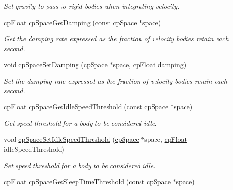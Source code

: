 \begin{DoxyCompactItemize}
\begin{DoxyCompactList}\small\item\em Set gravity to pass to rigid bodies when integrating velocity. \end{DoxyCompactList}\item 
\hyperlink{group__basic_types_gac1ed65573e035bf892505768c852d8d3}{cp\+Float} \hyperlink{group__cp_space_gaa22a14eff6829be47341fd0c4fac768e}{cp\+Space\+Get\+Damping} (const \hyperlink{structcp_space}{cp\+Space} $\ast$space)
\begin{DoxyCompactList}\small\item\em Get the damping rate expressed as the fraction of velocity bodies retain each second. \end{DoxyCompactList}\item 
void \hyperlink{group__cp_space_ga03fe1ee78d58a53479dec2ae27b628a4}{cp\+Space\+Set\+Damping} (\hyperlink{structcp_space}{cp\+Space} $\ast$space, \hyperlink{group__basic_types_gac1ed65573e035bf892505768c852d8d3}{cp\+Float} damping)
\begin{DoxyCompactList}\small\item\em Set the damping rate expressed as the fraction of velocity bodies retain each second. \end{DoxyCompactList}\item 
\hyperlink{group__basic_types_gac1ed65573e035bf892505768c852d8d3}{cp\+Float} \hyperlink{group__cp_space_gace9f8722a0de8941bef92e4e0a05b3f9}{cp\+Space\+Get\+Idle\+Speed\+Threshold} (const \hyperlink{structcp_space}{cp\+Space} $\ast$space)
\begin{DoxyCompactList}\small\item\em Get speed threshold for a body to be considered idle. \end{DoxyCompactList}\item 
void \hyperlink{group__cp_space_ga0a774d7bddac3cde239b44121b6039d3}{cp\+Space\+Set\+Idle\+Speed\+Threshold} (\hyperlink{structcp_space}{cp\+Space} $\ast$space, \hyperlink{group__basic_types_gac1ed65573e035bf892505768c852d8d3}{cp\+Float} idle\+Speed\+Threshold)
\begin{DoxyCompactList}\small\item\em Set speed threshold for a body to be considered idle. \end{DoxyCompactList}\item 
\hyperlink{group__basic_types_gac1ed65573e035bf892505768c852d8d3}{cp\+Float} \hyperlink{group__cp_space_ga607680bfdfa411b79d9154d1a573a8de}{cp\+Space\+Get\+Sleep\+Time\+Threshold} (const \hyperlink{structcp_space}{cp\+Space} $\ast$space)

\end{DoxyCompactItemize}
